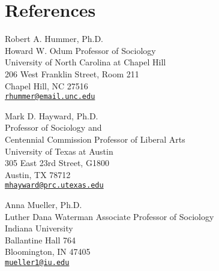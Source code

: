 \documentclass[11pt,]{article}
\begin{document}
\newpage

\hypertarget{references}{%
\section{References}\label{references}}

Robert A. Hummer, Ph.D.\\
Howard W. Odum Professor of Sociology\\
University of North Carolina at Chapel Hill\\
206 West Franklin Street, Room 211\\
Chapel Hill, NC 27516\\
\href{mailto:rhummer@email.unc.edu}{\nolinkurl{rhummer@email.unc.edu}}

Mark D. Hayward, Ph.D.\\
Professor of Sociology and\\
Centennial Commission Professor of Liberal Arts\\
University of Texas at Austin\\
305 East 23rd Street, G1800\\
Austin, TX 78712\\
\href{mailto:mhayward@prc.utexas.edu}{\nolinkurl{mhayward@prc.utexas.edu}}

Anna Mueller, Ph.D.\\
Luther Dana Waterman Associate Professor of Sociology\\
Indiana University\\
Ballantine Hall 764\\
Bloomington, IN 47405\\
\href{mailto:mueller1@iu.edu}{\nolinkurl{mueller1@iu.edu}}
\end{document}
